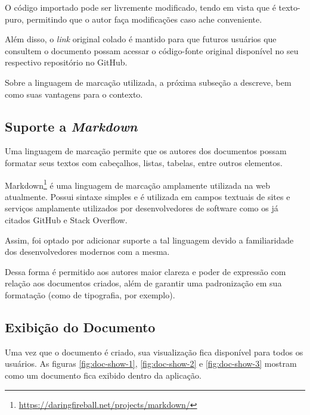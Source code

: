 O código importado pode ser livremente modificado, tendo em vista que é texto-puro, permitindo que o autor faça modificações caso ache conveniente.

Além disso, o \textit{link} original colado é mantido para que futuros usuários que consultem o documento possam acessar o código-fonte original disponível no seu respectivo repositório no GitHub.

Sobre a linguagem de marcação utilizada, a próxima subseção a descreve, bem como suas vantagens para o contexto.

\subsection{Suporte a \textit{Markdown}}

Uma linguagem de marcação permite que os autores dos documentos possam formatar seus textos com cabeçalhos, listas, tabelas, entre outros elementos.

Markdown\footnote{\url{https://daringfireball.net/projects/markdown/}} é uma linguagem de marcação amplamente utilizada na web atualmente. Possui sintaxe simples e é utilizada em campos textuais de sites e serviços amplamente utilizados por desenvolvedores de software como os já citados GitHub e Stack Overflow.

Assim, foi optado por adicionar suporte a tal linguagem devido a familiaridade dos desenvolvedores modernos com a mesma.

Dessa forma é permitido aos autores maior clareza e poder de expressão com relação aos documentos criados, além de garantir uma padronização em sua formatação (como de tipografia, por exemplo).

\subsection{Exibição do Documento}

Uma vez que o documento é criado, sua visualização fica disponível para todos os usuários. As figuras \ref{fig:doc-show-1}, \ref{fig:doc-show-2} e \ref{fig:doc-show-3} mostram como um documento fica exibido dentro da aplicação.


